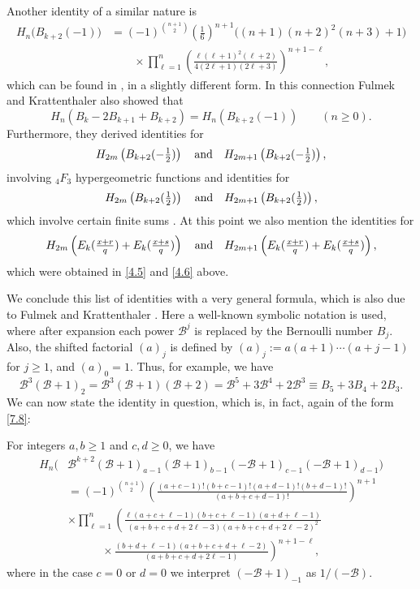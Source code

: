 \documentclass{amsart}
\theoremstyle{plain}
\newtheorem{theorem}{Theorem}[section]
\numberwithin{equation}{section}
\begin{document}
Another identity of a similar nature is
\begin{align}
H_n\big(B_{k+2}(-1)\big) &= (-1)^{\binom{n+1}{2}}\left(\frac{1}{6}\right)^{n+1}
\big((n+1)(n+2)^2(n+3)+1\big)\label{7.14} \\
&\qquad\times\prod_{\ell=1}^n\left(\frac{\ell(\ell+1)^2(\ell+2)}{4(2\ell+1)(2\ell+3)}\right)^{n+1-\ell},\nonumber
\end{align}
which can be found in \cite[Eq.~(7.2)]{FK}, in a slightly different form. In
this connection Fulmek and Krattenthaler also showed that 
\[
H_n\left(B_k-2B_{k+1}+B_{k+2}\right) = H_n\left(B_{k+2}(-1)\right)\qquad
(n\geq 0).
\]
Furthermore, they derived identities for
\[
H_{2m}\left(B_{k+2}(-\tfrac{1}{2})\right)\quad\hbox{and}\quad
H_{2m+1}\left(B_{k+2}(-\tfrac{1}{2})\right),
\]
involving $_4F_3$ hypergeometric functions \cite[Eq.~(7.3), (7.4)]{FK} and
identities for
\[
H_{2m}\left(B_{k+2}(\tfrac{1}{2})\right)\quad\hbox{and}\quad
H_{2m+1}\left(B_{k+2}(\tfrac{1}{2})\right),
\]
which involve certain finite sums \cite[Eq.~(7.5), (7.6)]{FK}. At this point
we also mention the identities for
\[
H_{2m}\left(E_k(\tfrac{x+r}{q})+E_k(\tfrac{x+s}{q})\right)\quad\hbox{and}\quad
H_{2m+1}\left(E_k(\tfrac{x+r}{q})+E_k(\tfrac{x+s}{q})\right),
\]
which were obtained in \eqref{4.5} and \eqref{4.6} above.

We conclude this list of identities with a very general formula, which is also
due to Fulmek and Krattenthaler \cite[Eq.~(5.3)]{FK}. Here a well-known symbolic
notation is used, where after expansion each power ${\mathcal B}^j$ is replaced
by the Bernoulli number $B_j$. Also, the shifted factorial $(a)_j$ is defined by
$(a)_j:=a(a+1)\cdots(a+j-1)$ for $j\geq 1$, and $(a)_0=1$. Thus, for example, we
have
\[
{\mathcal B}^3({\mathcal B}+1)_2={\mathcal B}^3({\mathcal B}+1)({\mathcal B}+2) 
= {\mathcal B}^5+3{\mathcal B}^4+2{\mathcal B}^3 \equiv B_5+3B_4+2B_3.
\]
We can now state the identity in question, which is, in fact, again of the form
\eqref{7.8}:

For integers $a,b\geq 1$ and $c,d\geq 0$, we have
\begin{align}
H_n\big(&{\mathcal B}^{k+2}({\mathcal B}+1)_{a-1}({\mathcal B}+1)_{b-1}(-{\mathcal B}+1)_{c-1}(-{\mathcal B}+1)_{d-1}\big)\label{7.15}\\
&=(-1)^{\binom{n+1}{2}}\left(\frac{(a+c-1)!(b+c-1)!(a+d-1)!(b+d-1)!}{(a+b+c+d-1)!}\right)^{n+1}\nonumber\\
&\times\prod_{\ell=1}^n\left(\frac{\ell(a+c+\ell-1)(b+c+\ell-1)(a+d+\ell-1)}
{(a+b+c+d+2\ell-3)(a+b+c+d+2\ell-2)^2}\right.\nonumber\\
&\qquad\quad\times\left.\frac{(b+d+\ell-1)(a+b+c+d+\ell-2)}{(a+b+c+d+2\ell-1)}\right)^{n+1-\ell},\nonumber
\end{align} 
where in the case $c=0$ or $d=0$ we interpret $(-{\mathcal B}+1)_{-1}$ as 
$1/(-{\mathcal B})$.
\end{document}
